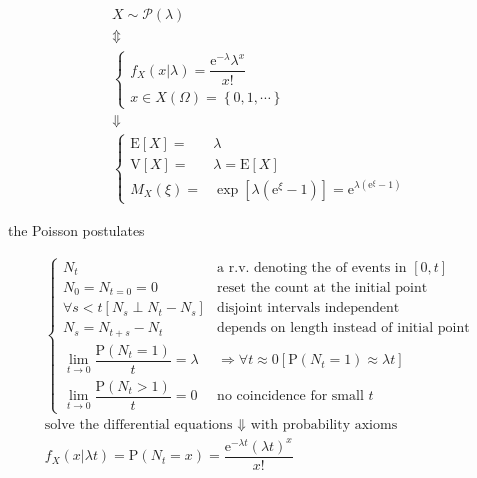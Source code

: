 \documentclass[
]{book}
\theoremstyle{definition}
\theoremstyle{definition}
\theoremstyle{definition}
\theoremstyle{definition}
\theoremstyle{remark}
\begin{document}
\[
\begin{array}{c}
X\sim\mathcal{P}\left(\lambda\right)\\
\Updownarrow\\
\begin{cases}
f_{{\scriptscriptstyle X}}\left(x|\lambda\right)=\dfrac{\mathrm{e}^{-\lambda}\lambda^{x}}{x!}\\
x\in X\left(\Omega\right)=\left\{ 0,1,\cdots\right\} 
\end{cases}\\
\Downarrow\\
\begin{cases}
\mathrm{E}\left[X\right]= & \lambda\\
\mathrm{V}\left[X\right]= & \lambda=\mathrm{E}\left[X\right]\\
M_{{\scriptscriptstyle X}}\left(\xi\right)= & \exp\left[\lambda\left(\mathrm{e}^{\xi}-1\right)\right]=\mathrm{e}^{\lambda\left(\mathrm{e}^{\xi}-1\right)}
\end{cases}
\end{array}
\]

the Poisson postulates

\[
\begin{array}{c}
\begin{cases}
N_{{\scriptscriptstyle t}} & \text{a r.v. denoting the of events in }\left[0,t\right]\\
N_{{\scriptscriptstyle 0}}=N_{{\scriptscriptstyle t=0}}=0 & \text{reset the count at the initial point}\\
\forall s<t\left[N_{{\scriptscriptstyle s}}\perp N_{{\scriptscriptstyle t}}-N_{{\scriptscriptstyle s}}\right] & \text{disjoint intervals independent}\\
N_{{\scriptscriptstyle s}}=N_{{\scriptscriptstyle t+s}}-N_{{\scriptscriptstyle t}} & \text{depends on length instead of initial point}\\
\lim\limits _{t\rightarrow0}\dfrac{\mathrm{P}\left(N_{{\scriptscriptstyle t}}=1\right)}{t}=\lambda & \Rightarrow\forall t\approx0\left[\mathrm{P}\left(N_{{\scriptscriptstyle t}}=1\right)\approx\lambda t\right]\\
\lim\limits _{t\rightarrow0}\dfrac{\mathrm{P}\left(N_{{\scriptscriptstyle t}}>1\right)}{t}=0 & \text{no coincidence for small }t
\end{cases}\\
\text{solve the differential equations }\Downarrow\text{ with probability axioms}\\
f_{{\scriptscriptstyle X}}\left(x|\lambda t\right)=\mathrm{P}\left(N_{{\scriptscriptstyle t}}=x\right)=\dfrac{\mathrm{e}^{-\lambda t}\left(\lambda t\right)^{x}}{x!}
\end{array}
\]
\end{document}
